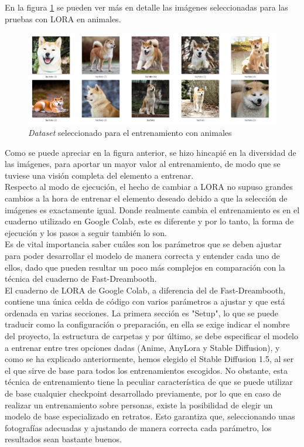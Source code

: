 En la figura \ref{fig:datasethachi} se pueden ver más en detalle las imágenes seleccionadas para las pruebas con LORA en animales.

\begin{figure}[h]
	\centering
	\includegraphics[width = 1
	\textwidth]{Imagenes/Vectorial/dataset_hachiko.png}
	\caption{\textit{Dataset} seleccionado para el entrenamiento con animales}
	\label{fig:datasethachi}
\end{figure}

Como se puede apreciar en la figura anterior, se hizo hincapié en la diversidad de las imágenes, para aportar un mayor valor al entrenamiento, de modo que se tuviese una visión completa del elemento a entrenar.\\

Respecto al modo de ejecución, el hecho de cambiar a LORA no supuso grandes cambios a la hora de entrenar el elemento deseado debido a que la selección de imágenes es exactamente igual. Donde realmente cambia el entrenamiento es en el cuaderno utilizado en Google Colab, este es diferente y por lo tanto, la forma de ejecución y los pasos a seguir también lo son. \\

Es de vital importancia saber cuáles son los parámetros que se deben ajustar para poder desarrollar el modelo de manera correcta y entender cada uno de ellos, dado que pueden resultar un poco más complejos en comparación con la técnica del cuaderno de Fast-Dreambooth.\\

El cuaderno de LORA de Google Colab, a diferencia del de Fast-Dreambooth, contiene una única celda de código con varios parámetros a ajustar y que  está ordenada en varias secciones. La primera sección es "Setup", lo que se puede traducir como la configuración o preparación, en ella se exige indicar el nombre del proyecto, la estructura de carpetas y por último, se debe especificar el modelo a entrenar entre tres opciones dadas (Anime, AnyLora y Stable Diffusion), y como se ha explicado anteriormente, hemos elegido el Stable Diffusion 1.5, al ser el que sirve de base para todos los entrenamientos escogidos. No obstante, esta técnica de entrenamiento tiene la peculiar característica de que se puede utilizar de base cualquier checkpoint desarrollado previamente, por lo que en caso de realizar un entrenamiento sobre personas, existe la posibilidad de elegir un modelo de base especializado en retratos. Esto garantiza que, seleccionando unas fotografías adecuadas y ajustando de manera correcta cada parámetro, los resultados sean bastante buenos.\\

